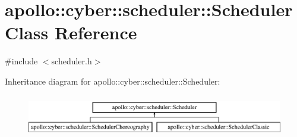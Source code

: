 \hypertarget{classapollo_1_1cyber_1_1scheduler_1_1Scheduler}{\section{apollo\-:\-:cyber\-:\-:scheduler\-:\-:Scheduler Class Reference}
\label{classapollo_1_1cyber_1_1scheduler_1_1Scheduler}
}


{\ttfamily \#include $<$scheduler.\-h$>$}

Inheritance diagram for apollo\-:\-:cyber\-:\-:scheduler\-:\-:Scheduler\-:\begin{figure}[H]
\begin{center}
\leavevmode
\includegraphics[height=1.860465cm]{classapollo_1_1cyber_1_1scheduler_1_1Scheduler}
\end{center}
\end{figure}
